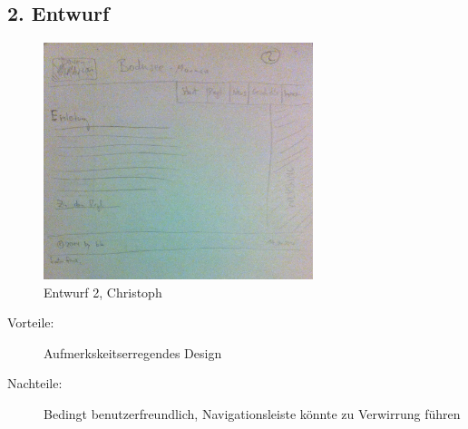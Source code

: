 \documentclass{scrartcl}
\begin{document}
 \subsection*{2. Entwurf}
  \begin{figure}[H]
 \centering
 \includegraphics[width=0.7\textwidth]{Version2.jpg}
\caption{Entwurf 2, Christoph}
\end{figure} 
 \begin{description}
 \item[Vorteile:] Aufmerkskeitserregendes Design
 \item[Nachteile:] Bedingt benutzerfreundlich, Navigationsleiste könnte zu Verwirrung führen
 \end{description}
\end{document}
